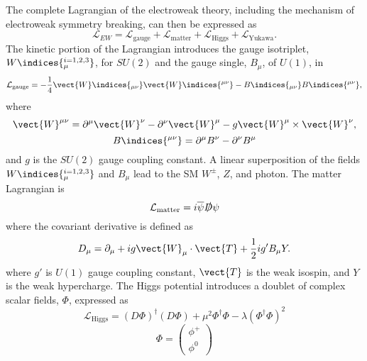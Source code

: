 The complete Lagrangian of the electroweak theory, including the mechanism 
of electroweak symmetry breaking, can then be expressed as
\begin{equation}
\mathcal{L}_{EW} = \mathcal{L}_\text{gauge} + \mathcal{L}_\text{matter} + \mathcal{L}_\text{Higgs} +   \mathcal{L}_\text{Yukawa}  .
\end{equation}
The kinetic portion of the Lagrangian introduces the gauge isotriplet, $W\indices{_{\mu}^{i=1,2,3}}$, for 
 $ SU\left(2\right) $ and the gauge single, $B_\mu$, of $ U\left(1\right) $, in
\begin{equation}
\mathcal{L}_\text{gauge} =  -\frac{1}{4} \vect{W}\indices{_{\mu\nu}}\vect{W}\indices{^{\mu\nu}} - B\indices{_{\mu\nu}}B\indices{^{\mu\nu}},
\end{equation}
where 
\begin{equation}
\vect{W}^{\mu\nu} = \partial^{\mu}\vect{W}^{\nu} - \partial^{\nu} \vect{W}^{\mu} - g \vect{W}^{\mu} \times \vect{W}^{\nu},
\end{equation}
\begin{equation}
B\indices{^{\mu\nu}} = \partial^{\mu} B^{\nu} - \partial^{\nu} B^{\mu}
\end{equation}
and $g$ is the $ SU\left(2\right) $ gauge coupling constant. A linear superposition of the 
fields  $W\indices{_{\mu}^{i=1,2,3}}$ and $B_\mu$ lead to the SM $W^{\pm}$, $Z$, and photon.
The matter Lagrangian is
\begin{equation}
\mathcal{L}_\text{matter} = i\overline{\psi}\slashed{D}\psi
\end{equation}
where the covariant derivative is defined as
\begin{equation}
D_{\mu} = \partial_\mu + i g \vect{W}_\mu \cdot \vect{T} + \frac{1}{2}i g' B_{\mu}Y.
\end{equation}
where $g'$ is  $ U\left(1\right) $ gauge coupling constant, $\vect{T}$ is the weak isospin, and $Y$ is the weak hypercharge.
The Higgs potential introduces a doublet of complex scalar fields, $\Phi$, expressed as
\begin{equation}
 \mathcal{L}_\text{Higgs} = \left(D\Phi\right)^{\dagger} \left(D\Phi\right) + \mu^2 \Phi^{\dagger} \Phi - \lambda  \left(\Phi^{\dagger} \Phi \right)^2
\end{equation}
\begin{equation}
\Phi = \left( \begin{matrix} \phi^+ \\ \phi^0\end{matrix} \right)
\end{equation}
